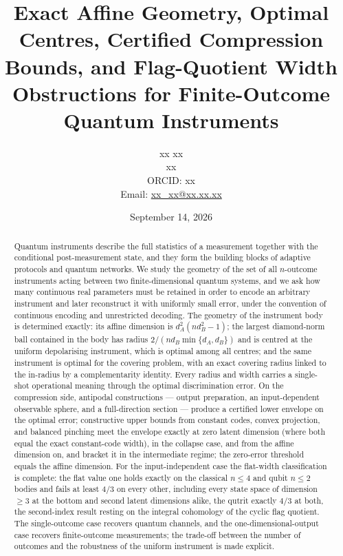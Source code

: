 \documentclass[11pt,a4paper]{article}
\title{\bf Exact Affine Geometry, Optimal Centres, Certified Compression Bounds, and Flag-Quotient Width Obstructions for Finite-Outcome Quantum Instruments}
\author{xx xx\\
\small xx\\
\small ORCID: xx\\
\small Email: \href{mailto:xx\_xx@xx.xx.xx}{xx\_xx@xx.xx.xx}}
\date{September 14, 2026}
\begin{document}
\maketitle

\begin{abstract}
Quantum instruments describe the full statistics of a measurement together with the conditional post-measurement state, and they form the building blocks of adaptive protocols and quantum networks. We study the geometry of the set of all $n$-outcome instruments acting between two finite-dimensional quantum systems, and we ask how many continuous real parameters must be retained in order to encode an arbitrary instrument and later reconstruct it with uniformly small error, under the convention of continuous encoding and unrestricted decoding. The geometry of the instrument body is determined exactly: its affine dimension is $d_A^2(nd_B^2-1)$; the largest diamond-norm ball contained in the body has radius $2/(nd_B\min\{d_A,d_B\})$ and is centred at the uniform depolarising instrument, which is optimal among all centres; and the same instrument is optimal for the covering problem, with an exact covering radius linked to the in-radius by a complementarity identity. Every radius and width carries a single-shot operational meaning through the optimal discrimination error. On the compression side, antipodal constructions --- output preparation, an input-dependent observable sphere, and a full-direction section --- produce a certified lower envelope on the optimal error; constructive upper bounds from constant codes, convex projection, and balanced pinching meet the envelope exactly at zero latent dimension (where both equal the exact constant-code width), in the collapse case, and from the affine dimension on, and bracket it in the intermediate regime; the zero-error threshold equals the affine dimension. For the input-independent case the flat-width classification is complete: the flat value one holds exactly on the classical $n\le4$ and qubit $n\le2$ bodies and fails at least $4/3$ on every other, including every state space of dimension $\ge3$ at the bottom and second latent dimensions alike, the qutrit exactly $4/3$ at both, the second-index result resting on the integral cohomology of the cyclic flag quotient. The single-outcome case recovers quantum channels, and the one-dimensional-output case recovers finite-outcome measurements; the trade-off between the number of outcomes and the robustness of the uniform instrument is made explicit.
\end{abstract}
\end{document}
